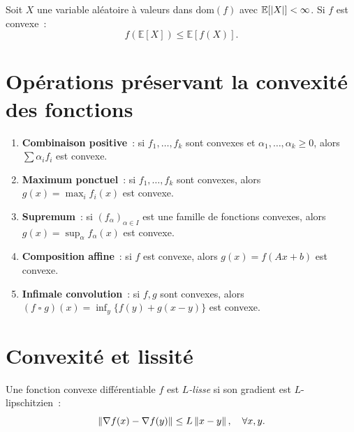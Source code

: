 \begin{corollaire}
Soit $X$ une variable al\'eatoire \`a valeurs dans $\mathrm{dom}(f)$ avec
$\mathbb{E}[\left| X \right|] < \infty$. Si $f$ est convexe~:
\[
    f(\mathbb{E}[X]) \leq \mathbb{E}[f(X)].
\]
\end{corollaire}

\section{Op\'erations pr\'eservant la convexit\'e des fonctions}

\begin{theoreme}
\label{thm:operations_fonctions}
\begin{enumerate}
    \item \textbf{Combinaison positive}~: si $f_1, \ldots, f_k$ sont convexes et
          $\alpha_1, \ldots, \alpha_k \geq 0$, alors $\sum \alpha_i f_i$ est convexe.
    \item \textbf{Maximum ponctuel}~: si $f_1, \ldots, f_k$ sont convexes, alors
          $g(x) = \max_i f_i(x)$ est convexe.
    \item \textbf{Supremum}~: si $(f_\alpha)_{\alpha \in I}$ est une famille de
          fonctions convexes, alors $g(x) = \sup_\alpha f_\alpha(x)$ est convexe.
    \item \textbf{Composition affine}~: si $f$ est convexe, alors $g(x) = f(Ax + b)$
          est convexe.
    \item \textbf{Infimale convolution}~: si $f, g$ sont convexes, alors
          $(f \mathop{\square} g)(x) = \inf_y \{f(y) + g(x-y)\}$ est convexe.
\end{enumerate}
\end{theoreme}

\section{Convexit\'e et lissit\'e}

\begin{definition}[$L$-lissit\'e]
Une fonction convexe diff\'erentiable $f$ est \emph{$L$-lisse} si son gradient est
$L$-lipschitzien~:
\[
    \left\| \nabla f(x) - \nabla f(y) \right\| \leq L\left\| x - y \right\|, \quad \forall x, y.
\]
\end{definition}

